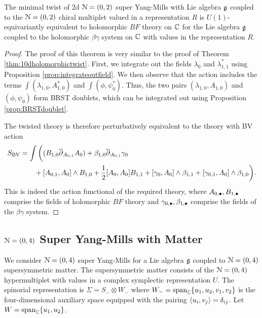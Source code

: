 \documentclass[10pt, oneside]{article}
\begin{document}
\begin{theorem} \label{2d(0,2)}
The minimal twist of 2d $\mathcal N=(0,2)$ super Yang-Mills with Lie algebra $\mathfrak g$ coupled to the $\mathcal N=(0,2)$ chiral multiplet valued in a representation $R$ is $U(1)$-equivariantly equivalent to holomorphic $BF$ theory on $\mathbb C$ for the Lie algebra $\mathfrak g$ coupled to the holomorphic $\beta\gamma$ system on $\mathbb C$ with values in the representation $R$. 
\end{theorem}
\begin{proof}
The proof of this theorem is very similar to the proof of Theorem \ref{thm:10dholomorphictwist}.  
First, we integrate out the fields $\lambda_{0}$ and $\lambda_{1,1}^*$ using Proposition \ref{prop:integrateoutfield}.  
We then observe that the action includes the terms $\int  (\lambda_{1,0} , A_{1,0}^*)$ and  $\int (\phi, \psi_0^*)$.  
Thus, the two pairs $(\lambda_{1,0}, A_{1,0})$ and $(\phi, \psi_0)$ form BRST doublets, 
which can be integrated out using Proposition \ref{prop:BRSTdoublet}.  

The twisted theory is therefore perturbatively equivalent to the theory with BV action 
\begin{align*}
 S_{\mathrm{BV}} &= \int \bigg( (B_{1,0} \overline{\partial}_{A_{0,1}} A_{0})  + \beta_{1,0} \overline{\partial}_{A_{0,1}} \gamma_{0} \\ 
  &\qquad  + [A_{0,1}, A_0]\wedge B_{1,0} + \frac{1}{2}[A_0, A_0]B_{1,1} +  [\gamma_0, A_0]\wedge \beta_{1,1} + [\gamma_{0,1}, A_0]\wedge \beta_{1,0}  \bigg).
\end{align*}
This is indeed the action functional of the required theory, where $A_{0,\bullet}, B_{1,\bullet}$ comprise the fields of holomorphic $BF$ theory and $\gamma_{0,\bullet}, \beta_{1,\bullet}$ comprise the fields of the $\beta\gamma$ system.
\end{proof}

\subsection{\texorpdfstring{$\mathcal N=(0,4)$}{N=(0,4)} Super Yang-Mills with Matter}

We consider $\mathcal N=(0,4)$ super Yang-Mills for a Lie algebra $\mathfrak g$ coupled to $\mathcal N=(0,4)$ supersymmetric matter. 
The supersymmetric matter consists of the $\mathcal N = (0,4)$ hypermultiplet with values in a complex symplectic representation $U$. 
The spinorial representation is $\Sigma = S_- \otimes W_-$ where $W_- = {\rm span}_{\mathbb C} \{u_1,u_2, v_1,v_2\}$ is the four-dimensional auxiliary space equipped with the pairing $\langle u_i, v_j\rangle = \delta_{ij}$. 
Let $W = {\rm span}_{\mathbb C} \{u_1,u_2\}$. 
\end{document}
